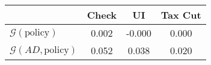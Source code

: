\begin{tabular}{@{}lccc@{}}
\toprule
                          & Check      & UI    & Tax Cut    \\  \midrule
$\mathcal{G}(\text{policy})$ & 0.002  & -0.000  & 0.000     \\
$\mathcal{G}(AD,\text{policy})$ & 0.052  & 0.038  & 0.020     \\
\end{tabular}
